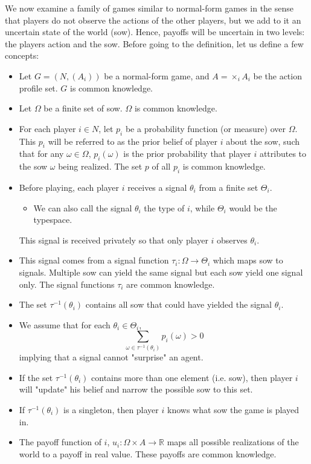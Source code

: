 \documentclass[12pt]{report}
\begin{document}
We now examine a family of games similar to normal-form games in the sense that players do not observe the actions of the other players, but we add to it an uncertain state of the world (sow). Hence, payoffs will be uncertain in two levels: the players action and the sow. Before going to the definition, let us define a few concepts:\begin{itemize}
\item Let $G = (N, (A_i))$ be a normal-form game, and $A = \times_i A_i$ be the action profile set. $G$ is common knowledge.
\item Let $\Omega$ be a finite set of sow. $\Omega$ is common knowledge.
\item For each player $i\in N$, let $p_i$ be a probability function (or measure) over $\Omega$. This $p_i$ will be referred to as the prior belief of player $i$ about the sow, such that for any $\omega\in\Omega$, $p_i(\omega)$ is the prior probability that player $i$ attributes to the sow $\omega$ being realized. The set $p$ of all $p_i$ is common knowledge.
\item Before playing, each player $i$ receives a signal $\theta_i$ from a finite set $\Theta_i$.
\begin{itemize}
\item We can also call the signal $\theta_i$ the type of $i$, while $\Theta_i$ would be the typespace.
\end{itemize} 
This signal is received privately so that only player $i$ observes $\theta_i$.
\item This signal comes from a signal function $\tau_i:\Omega\to\Theta_i$ which maps sow to signals. Multiple sow can yield the same signal but each sow yield one signal only. The signal functions $\tau_i$ are common knowledge.
\item The set $\tau^{-1}(\theta_i)$ contains all sow that could have yielded the signal $\theta_i$.
\item We assume that for each $\theta_i\in\Theta_i$, $$\sum_{\omega\in\tau^{-1}(\theta_i)} p_i(\omega) > 0 $$ implying that a signal cannot "surprise" an agent.
\item  If the set $\tau^{-1}(\theta_i)$ contains more than one element (i.e. sow), then player $i$ will "update" his belief and narrow the possible sow to this set.
\item If $\tau^{-1}(\theta_i)$ is a singleton, then player $i$ knows what sow the game is played in.
\item The payoff function of $i$, $u_i:\Omega\times A \to\mathbb{R}$ maps all possible realizations of the world to a payoff in real value. These payoffs are common knowledge.
\end{itemize}
\end{document}

